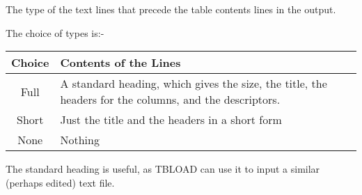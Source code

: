 {{{ The type of the text lines that precede the table contents lines in the 
 output.
                                                           
  The choice of types is:-

\begin{tabular}{|c|p{4.5in}|}\hline
   Choice  &  Contents of the Lines\\ \hline
   Full    &  A standard heading, which gives the size, the title, the
             headers for the columns, and the descriptors. \\
   Short   &  Just the title and the headers in a short form \\
   None    &  Nothing \\ \hline
\end{tabular}
                                                                               
  The standard heading is useful, as TBLOAD can use it to input a similar
  (perhaps edited) text file.
                                                                               
}}}
